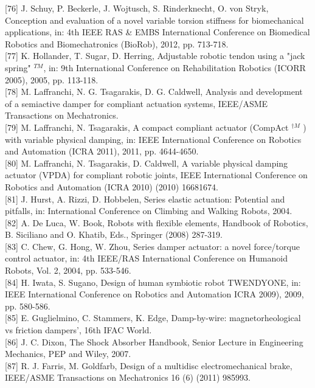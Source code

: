 \documentclass[10pt]{article}
\begin{document}
[76] J. Schuy, P. Beckerle, J. Wojtusch, S. Rinderknecht, O. von Stryk, Conception and evaluation of a novel variable torsion stiffness for biomechanical applications, in: 4th IEEE RAS \& EMBS International Conference on Biomedical Robotics and Biomechatronics (BioRob), 2012, pp. 713-718.\\[0pt]
[77] K. Hollander, T. Sugar, D. Herring, Adjustable robotic tendon using a "jack spring" ${ }^{T M}$, in: 9th International Conference on Rehabilitation Robotics (ICORR 2005), 2005, pp. 113-118.\\[0pt]
[78] M. Laffranchi, N. G. Tsagarakis, D. G. Caldwell, Analysis and development of a semiactive damper for compliant actuation systems, IEEE/ASME Transactions on Mechatronics.\\[0pt]
[79] M. Laffranchi, N. Tsagarakis, A compact compliant actuator (CompAct ${ }^{\dagger M}$ ) with variable physical damping, in: IEEE International Conference on Robotics and Automation (ICRA 2011), 2011, pp. 4644-4650.\\[0pt]
[80] M. Laffranchi, N. Tsagarakis, D. Caldwell, A variable physical damping actuator (VPDA) for compliant robotic joints, IEEE International Conference on Robotics and Automation (ICRA 2010) (2010) 16681674.\\[0pt]
[81] J. Hurst, A. Rizzi, D. Hobbelen, Series elastic actuation: Potential and pitfalls, in: International Conference on Climbing and Walking Robots, 2004.\\[0pt]
[82] A. De Luca, W. Book, Robots with flexible elements, Handbook of Robotics, B. Siciliano and O. Khatib, Eds., Springer (2008) 287-319.\\[0pt]
[83] C. Chew, G. Hong, W. Zhou, Series damper actuator: a novel force/torque control actuator, in: 4th IEEE/RAS International Conference on Humanoid Robots, Vol. 2, 2004, pp. 533-546.\\[0pt]
[84] H. Iwata, S. Sugano, Design of human symbiotic robot TWENDYONE, in: IEEE International Conference on Robotics and Automation ICRA 2009), 2009, pp. 580-586.\\[0pt]
[85] E. Guglielmino, C. Stammers, K. Edge, Damp-by-wire: magnetorheological vs friction dampers', 16th IFAC World.\\[0pt]
[86] J. C. Dixon, The Shock Absorber Handbook, Senior Lecture in Engineering Mechanics, PEP and Wiley, 2007.\\[0pt]
[87] R. J. Farris, M. Goldfarb, Design of a multidisc electromechanical brake, IEEE/ASME Transactions on Mechatronics 16 (6) (2011) 985993.\\[0pt]
\end{document}
